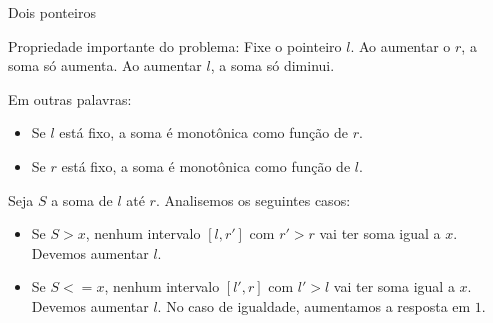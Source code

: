 \begin{frame}{Dois ponteiros}

    Propriedade importante do problema: Fixe o pointeiro $l$. Ao aumentar o $r$, a soma só aumenta. Ao aumentar $l$, a soma só diminui.  \pause

    Em outras palavras:
    \begin{itemize}
        \item Se $l$ está fixo, a soma é monotônica como função de $r$.
        \item Se $r$ está fixo, a soma é monotônica como função de $l$.
    \end{itemize} \pause

    Seja $S$ a soma de $l$ até $r$. Analisemos os seguintes casos: \pause
    \begin{itemize}
        \item Se $S > x$, nenhum intervalo $[l, r']$ com $r' > r$ vai ter soma igual a $x$. Devemos aumentar $l$. \pause
        \item Se $S <= x$, nenhum intervalo $[l', r]$ com $l' > l$ vai ter soma igual a $x$. Devemos aumentar $l$. No caso de igualdade, aumentamos a resposta em $1$. \pause
    \end{itemize}
    
\end{frame}

